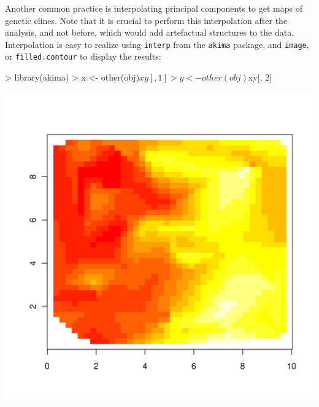 \documentclass{article}
\begin{document}
Another common practice is interpolating principal components to get maps of genetic clines.
Note that it is crucial to perform this interpolation after the analysis, and not before, which
would add artefactual structures to the data.
Interpolation is easy to realize using \texttt{interp} from the \texttt{akima} package, and
\texttt{image}, or \texttt{filled.contour} to display the results:
\begin{Schunk}
\begin{Sinput}
> library(akima)
> x <- other(obj)$xy[, 1]
> y <- other(obj)$xy[, 2]
\end{Sinput}
\end{Schunk}
\begin{Schunk}
\end{Schunk}
\includegraphics{figs/spca-021}
\end{document}
